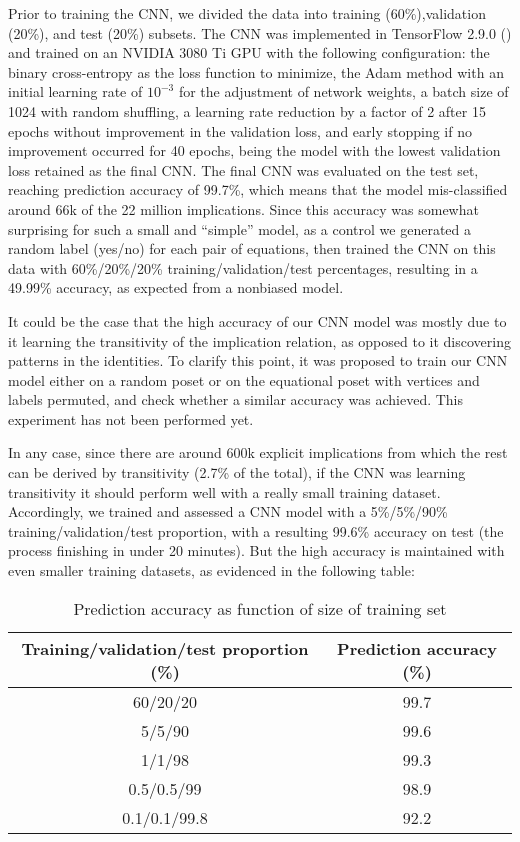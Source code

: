 \smallskip

Prior to training the CNN, we divided the data into training (60\%),validation (20\%), and test (20\%) subsets. The CNN was implemented in TensorFlow 2.9.0 (\cite{tensorflow2015-whitepaper}) and trained on an NVIDIA 3080 Ti GPU with the following configuration: the binary cross-entropy as the loss function to minimize, the Adam method with an initial learning rate of $10^{-3}$ for the adjustment of network weights, a batch size of 1024 with random shuffling, a learning rate reduction by a factor of 2 after 15 epochs without improvement in the validation loss, and early stopping if no improvement occurred for 40 epochs, being the model with the lowest validation loss retained as the final CNN.
The final CNN was evaluated on the test set, reaching prediction accuracy of 99.7\%, which means that the model mis-classified around 66k of the 22 million implications. Since this accuracy was somewhat surprising for such a small and “simple” model, as a control we generated a random label (yes/no) for each pair of equations, then trained the CNN on this data with 60\%/20\%/20\% training/validation/test percentages, resulting in a 49.99\% accuracy, as expected from a nonbiased model.

\smallskip

It could be the case that the high accuracy of our CNN model was mostly due to it learning the transitivity of the implication relation, as opposed to it discovering patterns in the identities. To clarify this point, it was proposed to train our CNN model either on a random poset or on the equational poset with vertices and labels permuted, and check whether a similar accuracy was achieved. This experiment has not been performed yet.

\smallskip

In any case, since there are around 600k explicit implications from which the rest can be derived by transitivity (2.7\% of the total), if the CNN was learning transitivity it should perform well with a really small training dataset. Accordingly, we trained and assessed a CNN model with a 5\%/5\%/90\% training/validation/test proportion, with a resulting 99.6\% accuracy on test (the process finishing in under 20 minutes). But the high accuracy is maintained with even smaller training datasets, as evidenced in the following table:
\begin{table}[h]
\centering
\begin{tabular}{|c|c|}
\hline
  \textbf{Training/validation/test proportion (\%)} & \textbf{Prediction accuracy (\%)} \\\hline\hline
  60/20/20 & 99.7 \\\hline
  5/5/90 & 99.6 \\\hline
  1/1/98 & 99.3 \\\hline
  0.5/0.5/99 & 98.9 \\\hline
  0.1/0.1/99.8 & 92.2 \\
  \hline
\end{tabular}
\caption{Prediction accuracy as function of size of training set}
\end{table}

